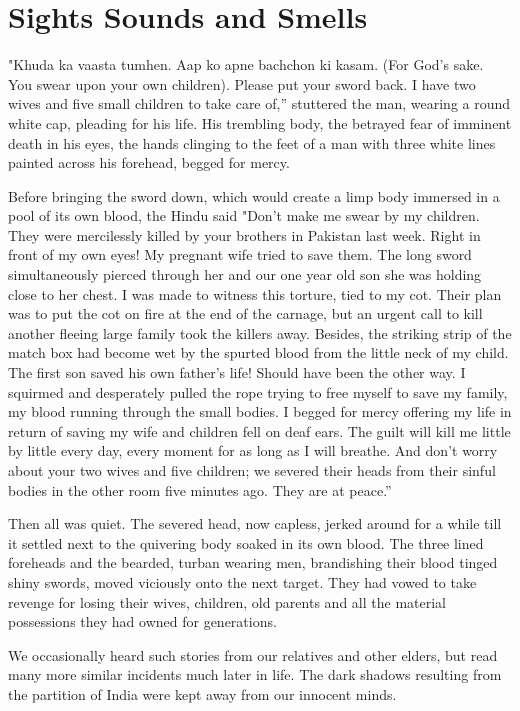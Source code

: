 \chapter{Sights Sounds and Smells}
"Khuda ka vaasta tumhen. Aap ko apne bachchon ki kasam. (For God's sake.
You swear upon your own children). Please put your sword back. I have two
wives and five small children to take care of,” stuttered the man, wearing
a round white cap, pleading for his life. His trembling body, the betrayed
fear of imminent death in his eyes, the hands clinging to the feet of
a man with three white lines painted across his forehead, begged for
mercy. 

Before bringing the sword down, which would create a limp body immersed in
a pool of its own blood, the Hindu said "Don't make me swear by my
children. They were mercilessly killed by your brothers in Pakistan last
week. Right in front of my own eyes! My pregnant wife tried to save them.
The long sword simultaneously pierced through her and our one year old son
she was holding close to her chest. I was made to witness this torture,
tied to my cot. Their plan was to put the cot on fire at the end of the
carnage, but an urgent call to kill another fleeing large family took the
killers away. Besides, the striking strip of the match box had become wet
by the spurted blood from the little neck of my child. The first son saved
his own father's life! Should have been the other way. I squirmed and
desperately pulled the rope trying to free myself to save my family, my
blood running through the small bodies. I begged for mercy offering my
life in return of saving my wife and children fell on deaf ears. The guilt
will kill me little by little every day, every moment for as long as
I will breathe. And don't worry about your two wives and five children; we
severed their heads from their sinful bodies in the other room five
minutes ago. They are at peace.” 

Then all was quiet. The severed head, now capless, jerked around for
a while till it settled next to the quivering body soaked in its own
blood. The three lined foreheads and the bearded, turban wearing men,
brandishing their blood tinged shiny swords, moved viciously onto the next
target. They had vowed to take revenge for losing their wives, children,
old parents and all the material possessions they had owned for
generations. 

We occasionally heard such stories from our relatives and other elders,
but read many more similar incidents much later in life. The dark shadows
resulting from the partition of India were kept away from our innocent
minds. 

